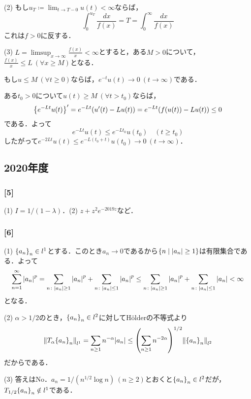 \documentclass[a4j]{ltjsarticle}
\newcommand{\1}{\mathbbm{1}}
\numberwithin{equation}{section}
\theoremstyle{definition}
\begin{document}
(2) もし$u_T\coloneq \lim_{t\to T-0}u(t)<\infty$ならば，
\begin{equation}
    \int_{0}^{u_T}\frac{dx}{f(x)}=T=\int_{0}^{\infty}\frac{dx}{f(x)}
\end{equation}
これは$f>0$に反する．

(3) $L=\limsup_{x\to\infty}\frac{f(x)}{x}<\infty$とすると，ある$M>0$について，$\frac{f(x)}{x}\leq L\ (\forall x\geq M)$となる．

もし$u\leq M\ (\forall t\geq0)$ならば，$e^{-t}u(t)\to0\ (t\to\infty)$である．

ある$t_0>0$について$u(t)\geq M\ (\forall t>t_0)$ならば，
\begin{equation}
    \qty{e^{-Lt}u(t)}'=e^{-Lt}(u'(t)-Lu(t))=e^{-Lt}(f(u(t))-Lu(t))\leq 0
\end{equation}
である．よって
\begin{equation}
    e^{-Lt}u(t)\leq e^{-Lt_0}u(t_0)\quad (t\geq t_0)
\end{equation}
したがって$e^{-2Lt}u(t)\leq e^{-L(t_0+t)}u(t_0)\to 0\ (t\to\infty)$．
\subsection{2020年度}
\subsubsection*{[5]}
(1) $I=1/(1-\lambda)$．(2) $z+z^2e^{-2019z}$など．

\subsubsection*{[6]}
(1) $\qty{a_n}_n\in l^1$とする．このとき$a_n\to0$であるから$\qty{n\mid \abs{a_n}\geq 1}$は有限集合である．よって
\begin{equation}
    \sum_{n=1}^\infty \abs{a_n}^p=\sum_{n\colon \abs{a_n}\geq 1}\abs{a_n}^p+\sum_{n\colon \abs{a_n}\leq 1}\abs{a_n}^p \leq \sum_{n\colon \abs{a_n}\geq 1}\abs{a_n}^p+\sum_{n\colon \abs{a_n}\leq 1}\abs{a_n}<\infty 
\end{equation}
となる．

(2) $\alpha>1/2$のとき，$\qty{a_n}_n\in l^2$に対してHölderの不等式より 
\begin{equation}
    \norm{T_\alpha \qty{a_n}_n}_{l^1}=\sum_{n\geq1} n^{-\alpha}\abs{a_n}\leq \qty(\sum_{n\geq 1}n^{-2\alpha})^{1/2}\norm{\qty{a_n}_n}_{l^2}
\end{equation}
だからである．

(3) 答えはNo．$a_n=1/(n^{1/2}\log n)\ (n\geq 2)$とおくと$\qty{a_n}_n\in l^2$だが，$T_{1/2}\qty{a_n}_n\notin l^1$である．
\end{document}

